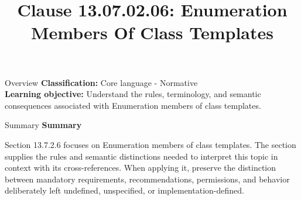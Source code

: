 \documentclass[10pt,letterpaper]{article}
\title{Clause 13.07.02.06: Enumeration Members Of Class Templates}
\author{}
\date{}
\begin{document}
\maketitle
\begin{CornellOverviewBox}{Overview}
\textbf{Classification:} Core language - Normative\\[2pt]
\textbf{Learning objective:} Understand the rules, terminology, and semantic consequences associated with Enumeration members of class templates.
\end{CornellOverviewBox}\begin{CornellSummaryBox}{Summary}
{\sffamily\bfseries\color{Accent} Summary}\par\vspace{3pt}Section 13.7.2.6 focuses on Enumeration members of class templates. The section supplies the rules and semantic distinctions needed to interpret this topic in context with its cross-references. When applying it, preserve the distinction between mandatory requirements, recommendations, permissions, and behavior deliberately left undefined, unspecified, or implementation-defined.
\end{CornellSummaryBox}
\end{document}
